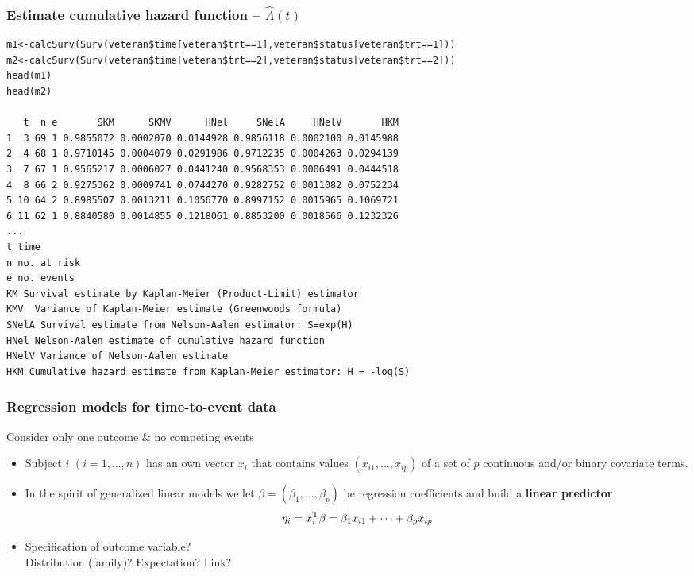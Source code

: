 \documentclass[12pt]{beamer}
\begin{document}
\begin{frame}[fragile]
\frametitle{Estimate cumulative hazard function -- $\hat \Lambda(t)$}

{\scriptsize \begin{verbatim}
m1<-calcSurv(Surv(veteran$time[veteran$trt==1],veteran$status[veteran$trt==1]))
m2<-calcSurv(Surv(veteran$time[veteran$trt==2],veteran$status[veteran$trt==2]))
head(m1)
head(m2)

   t  n e       SKM      SKMV      HNel     SNelA     HNelV       HKM
1  3 69 1 0.9855072 0.0002070 0.0144928 0.9856118 0.0002100 0.0145988
2  4 68 1 0.9710145 0.0004079 0.0291986 0.9712235 0.0004263 0.0294139
3  7 67 1 0.9565217 0.0006027 0.0441240 0.9568353 0.0006491 0.0444518
4  8 66 2 0.9275362 0.0009741 0.0744270 0.9282752 0.0011082 0.0752234
5 10 64 2 0.8985507 0.0013211 0.1056770 0.8997152 0.0015965 0.1069721
6 11 62 1 0.8840580 0.0014855 0.1218061 0.8853200 0.0018566 0.1232326
...
t time
n no. at risk
e no. events
KM Survival estimate by Kaplan-Meier (Product-Limit) estimator
KMV	 Variance of Kaplan-Meier estimate (Greenwoods formula)
SNelA Survival estimate from Nelson-Aalen estimator: S=exp(H)
HNel Nelson-Aalen estimate of cumulative hazard function
HNelV Variance of Nelson-Aalen estimate
HKM	Cumulative hazard estimate from Kaplan-Meier estimator: H = -log(S)
\end{verbatim}
}
\end{frame}

\begin{frame}

\frametitle{Regression models for time-to-event data}

Consider only one outcome \& no competing events
 \begin{itemize} 
 \item
Subject $i$ $(i=1, \dots, n)$ has an own vector $x_i$ that contains
 values $(x_{i1}, \dots, x_{ip})$ of a set of $p$ 
continuous and/or binary covariate terms.
\medskip
\item
 In the spirit of generalized linear models we let 
  $\beta = (\beta_1, \dots, \beta_p)$ be regression coefficients
  and build  a \textbf{linear predictor} 
 $$ \eta_i =
x_i^{\small\text{T}} \beta =  \beta_1 x_{i1} + \dots + \beta_p x_{ip} $$ 
\item
Specification of outcome variable? \\
 Distribution (family)? Expectation? Link?  
\end{itemize} 
\end{frame}
\end{document}
